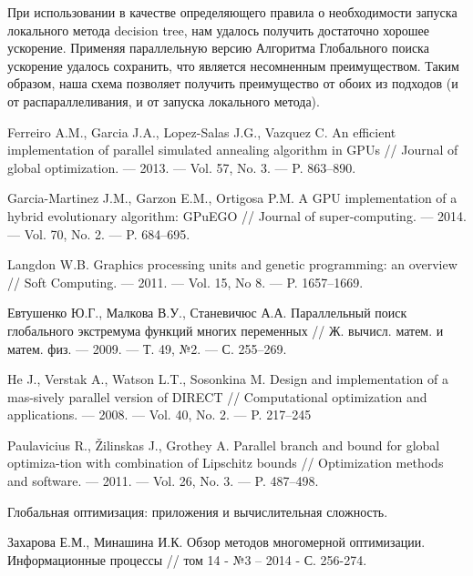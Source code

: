 \documentclass{svproc}
\begin{document}
При использовании в качестве определяющего правила о необходимости запуска локального метода decision tree, нам удалось получить достаточно хорошее ускорение. Применяя параллельную версию Алгоритма Глобального поиска ускорение удалось сохранить, что является несомненным преимуществом. Таким образом, наша схема позволяет получить преимущество от обоих из подходов (и от распараллеливания, и от запуска локального метода).





%
%

\begin{thebibliography}{6}
%

Ferreiro A.M., Garcia J.A., Lopez-Salas J.G., Vazquez C. An efficient implementation of parallel simulated annealing algorithm in GPUs // Journal of global optimization. — 2013. — Vol. 57, No. 3. — P. 863–890.

Garcia-Martinez J.M., Garzon E.M., Ortigosa P.M. A GPU implementation of a hybrid evolutionary algorithm: GPuEGO // Journal of super-computing. — 2014. — Vol. 70, No. 2. — P. 684–695.

Langdon W.B. Graphics processing units and genetic programming: an overview // Soft Computing. — 2011. — Vol. 15, No 8. — P. 1657–1669.

Евтушенко Ю.Г., Малкова В.У., Станевичюс А.А. Параллельный поиск глобального экстремума функций многих переменных // Ж. вычисл. матем. и матем. физ. — 2009. — Т. 49, №2. — С. 255–269.

He J., Verstak A., Watson L.T., Sosonkina M. Design and implementation of a mas-sively parallel version of DIRECT // Computational optimization and applications. — 2008. — Vol. 40, No. 2. — P. 217–245

Paulavicius R., Žilinskas J., Grothey A. Parallel branch and bound for global optimiza-tion with combination of Lipschitz bounds // Optimization methods and software. — 2011. — Vol. 26, No. 3. — P. 487–498.

Глобальная оптимизация: приложения и вычислительная сложность. %

Захарова Е.М., Минашина И.К. Обзор методов многомерной оптимизации. Информационные процессы // том 14 - №3 – 2014 - С. 256-274.


\end{thebibliography}
\end{document}
